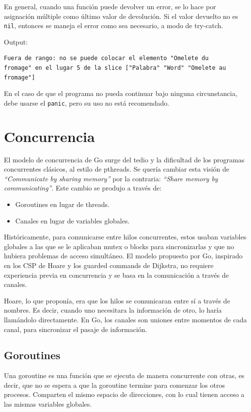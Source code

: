 \documentclass{article}
\begin{document}
En general, cuando una función puede devolver un error, se lo hace por asignación múltiple como último valor de devolución. Si el valor devuelto no es \lstinline|nil|, entonces se maneja el error como sea necesario, a modo de try-catch.


Output: 
\begin{verbatim}
Fuera de rango: no se puede colocar el elemento "Omelete du 
fromage" en el lugar 5 de la slice ["Palabra" "Word" "Omelete au
fromage"]
\end{verbatim}

En el caso de que el programa no pueda continuar bajo ninguna circunstancia, debe usarse el \lstinline|panic|, pero su uso no está recomendado.

\section{Concurrencia}

El modelo de concurrencia de Go surge del tedio y la dificultad de los programas concurrentes clásicos, al estilo de pthreads. Se quería cambiar esta visión de \emph{``Communicate by sharing memory''} por la contraria: \emph{``Share memory by communicating''}. Este cambio se produjo a través de:
\begin{itemize}
\item Goroutines en lugar de threads.
\item Canales en lugar de variables globales.
\end{itemize}

Históricamente, para comunicarse entre hilos concurrentes, estos usaban variables globales a las que se le aplicaban mutex o blocks para sincronizarlas y que no hubiera problemas de acceso simultáneo. El modelo propuesto por Go, inspirado en los CSP de Hoare y los guarded commands de Dijkstra, no requiere experiencia previa en concurrencia y se basa en la comunicación a través de canales. %

Hoare, lo que proponía, era que los hilos se comunicaran entre sí a través de nombres. Es decir, cuando uno necesitara la información de otro, lo haría llamándolo directamente. En Go, los canales son uniones entre momentos de cada canal, para sincronizar el pasaje de información.

\subsection{Goroutines}
Una goroutine es una función que se ejecuta de manera concurrente con otras, es decir, que no se espera a que la goroutine termine para comenzar los otros procesos. Comparten el mismo espacio de direcciones, con lo cual tienen acceso a las mismas variables globales.
\end{document}
